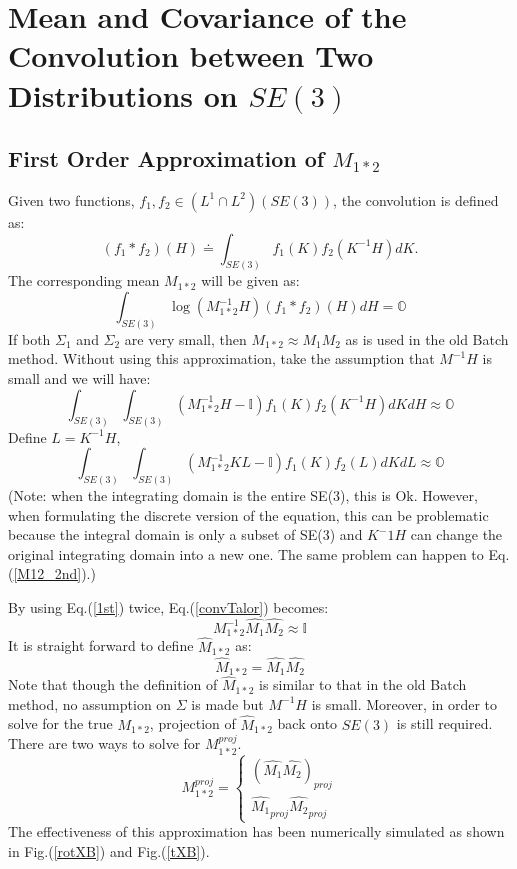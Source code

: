 \documentclass[twocolumn,10pt]{asme2ej}
\newcommand{\II}{\mathbb{I}}
\begin{document}
\section{Mean and Covariance of the  Convolution between Two Distributions on $SE(3)$}
\subsection{First Order Approximation of $M_{1*2}$}
Given two functions, $f_1, f_2 \in (L^1 \cap L^2)(SE(3))$, the convolution is defined as:
\begin{equation}
(f_1 * f_2)(H) \doteq \int_{SE(3)} f_1(K) f_2(K^{-1} H) dK. 
\label{convdef}
\end{equation}
The corresponding mean $M_{1*2}$ will be given as:
\begin{equation}
\int_{SE(3)} \log(M_{1*2}^{-1}H) (f_1*f_2)(H)dH = \mathbb{O}
\end{equation}
If both $\Sigma_1$ and $\Sigma_2$ are very small, then $M_{1*2} \approx M_1 M_2$ as is used in the old Batch method. Without using this approximation, take the assumption that $M^{-1}H$ is small and we will have:
\begin{equation}
\int_{SE(3)}\int_{SE(3)} \left(M_{1*2}^{-1}H - \II \right)f_{1}(K)f_{2}(K^{-1}H)dKdH \approx \mathbb{O}
\end{equation}
Define $L = K^{-1}H$,
\begin{equation}
\int_{SE(3)}\int_{SE(3)} \left(M_{1*2}^{-1}KL - \II \right)f_{1}(K)f_{2}(L)dKdL \approx \mathbb{O}
\label{convTalor}
\end{equation}
(Note: when the integrating domain is the entire SE(3), this is Ok. However, when formulating the discrete version of the equation, this can be problematic because the integral domain is only a subset of SE(3) and $K^-1H$ can change the original integrating domain into a new one. The same problem can happen to Eq.(\ref{M12_2nd}).)

By using Eq.(\ref{1st}) twice, Eq.(\ref{convTalor}) becomes:
\begin{equation}
M_{1*2}^{-1} \widehat{M_1}\widehat{M_2} \approx \II
\end{equation}
It is straight forward to define $\widehat{M}_{1*2}$ as:
\begin{equation}
\boxed{\widehat{M}_{1*2} = \widehat{M_1}\widehat{M_2}}
\end{equation}
Note that though the definition of $\widehat{M}_{1*2}$ is similar to that in the old Batch method, no assumption on $\Sigma$ is made but $M^{-1}H$ is small. Moreover, in order to solve for the true $M_{1*2}$, projection of $\widehat{M}_{1*2}$ back onto $SE(3)$ is still required. 
There are two ways to solve for $M_{1*2}^{proj}$.
\begin{equation}
M_{1*2}^{proj}=
\begin{cases}
\left(\widehat{M_1}\widehat{M_2}\right)_{proj}\\
\widehat{M_{1}}_{proj}\widehat{M_{2}}_{proj}
\end{cases}
\label{b_old}
\end{equation}
The effectiveness of this approximation has been numerically simulated as shown in Fig.(\ref{rotXB}) and Fig.(\ref{tXB}).
\end{document}
